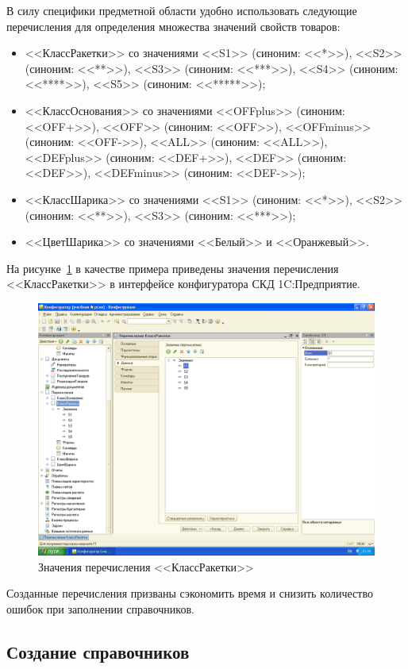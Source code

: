 В силу специфики предметной области удобно использовать следующие
перечисления для определения множества значений свойств товаров:
\begin{itemize}
\item <<КлассРакетки>> со значениями
  <<S1>> (синоним: <<*>>),
  <<S2>> (синоним: <<**>>),
  <<S3>> (синоним: <<***>>),
  <<S4>> (синоним: <<****>>),
  <<S5>> (синоним: <<*****>>);
\item <<КлассОснования>> со значениями
  <<OFFplus>> (синоним: <<OFF+>>),
  <<OFF>> (синоним: <<OFF>>),
  <<OFFminus>> (синоним: <<OFF->>),
  <<ALL>> (синоним: <<ALL>>),
  <<DEFplus>> (синоним: <<DEF+>>),
  <<DEF>> (синоним: <<DEF>>),
  <<DEFminus>> (синоним: <<DEF->>);
\item <<КлассШарика>> со значениями
  <<S1>> (синоним: <<*>>),
  <<S2>> (синоним: <<**>>),
  <<S3>> (синоним: <<***>>);
\item <<ЦветШарика>> со значениями
  <<Белый>> и
  <<Оранжевый>>.
\end{itemize}

На рисунке~\ref{fig:enum} в качестве примера приведены
значения перечисления <<КлассРакетки>> в интерфейсе конфигуратора
СКД 1C:Предприятие.

\begin{figure}[h!]
  \centering
  \includegraphics[width=130mm]{pic/enum}
  \caption{Значения перечисления <<КлассРакетки>>}
  \label{fig:enum}
\end{figure}

Созданные перечисления призваны сэкономить время и снизить количество
ошибок при заполнении справочников.

\subsection{Создание справочников}

